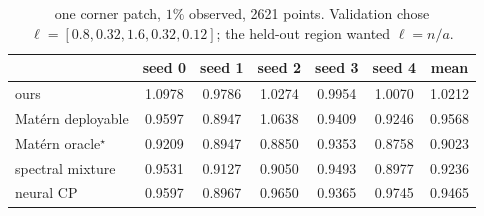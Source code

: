 \begin{table}[h]
  \centering
  \caption{one corner patch, $1\%$ observed, 2621 points.  Validation chose $\ell = [0.8, 0.32, 1.6, 0.32, 0.12]$; the held-out region wanted $\ell = n/a$.}
  \small
  \begin{tabular}{lcccccc}
    \toprule
    & seed 0 & seed 1 & seed 2 & seed 3 & seed 4 & mean \\
    \midrule
    ours & 1.0978 & 0.9786 & 1.0274 & 0.9954 & 1.0070 & 1.0212 \\
    Mat\'ern deployable & 0.9597 & 0.8947 & 1.0638 & 0.9409 & 0.9246 & 0.9568 \\
    Mat\'ern oracle$^\star$ & 0.9209 & 0.8947 & 0.8850 & 0.9353 & 0.8758 & 0.9023 \\
    spectral mixture & 0.9531 & 0.9127 & 0.9050 & 0.9493 & 0.8977 & 0.9236 \\
    neural CP & 0.9597 & 0.8967 & 0.9650 & 0.9365 & 0.9745 & 0.9465 \\
    \bottomrule
  \end{tabular}
\end{table}

